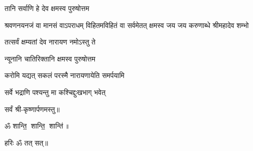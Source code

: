 
{तानि सर्वाणि हे देव क्षमस्व पुरुषोत्तम}

{श्रवणनयनजं वा मानसं वाऽपराधम्}
{विहितमविहितं वा सर्वमेतत् क्षमस्व}
{जय जय करुणाब्धे श्रीमहादेव शम्भो}

{तत्सर्वं क्षम्यतां देव नारायण नमोऽस्तु ते}

{न्यूनानि चातिरिक्तानि क्षमस्व पुरुषोत्तम}

{करोमि यद्यत् सकलं परस्मै नारायणायेति समर्पयामि}

{सर्वे भद्राणि पश्यन्तु मा कश्चिद्दुःखभाग् भवेत्}
\centerline{सर्वं श्री-कृष्णार्पणमस्तु॥}
\centerline{ॐ शान्ति॒ शान्ति॒ शान्ति॑॥}
\centerline{हरिः ॐ तत् सत्॥}

\closesection